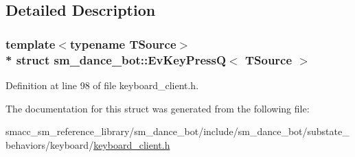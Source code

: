 \subsection{Detailed Description}
\subsubsection*{template$<$typename T\+Source$>$\\*
struct sm\+\_\+dance\+\_\+bot\+::\+Ev\+Key\+Press\+Q$<$ T\+Source $>$}



Definition at line 98 of file keyboard\+\_\+client.\+h.



The documentation for this struct was generated from the following file\+:\begin{DoxyCompactItemize}
\item 
smacc\+\_\+sm\+\_\+reference\+\_\+library/sm\+\_\+dance\+\_\+bot/include/sm\+\_\+dance\+\_\+bot/substate\+\_\+behaviors/keyboard/\hyperlink{keyboard__client_8h}{keyboard\+\_\+client.\+h}\end{DoxyCompactItemize}
